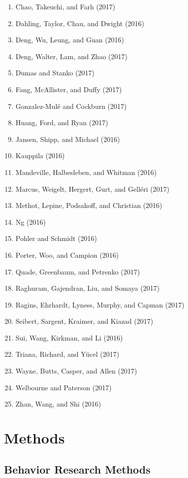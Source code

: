 \documentclass[english,man]{apa6}
\providecommand{\tightlist}{%
  \setlength{\itemsep}{0pt}\setlength{\parskip}{0pt}}
\theoremstyle{definition}
\theoremstyle{definition}
\theoremstyle{definition}
\theoremstyle{remark}
\begin{document}
\begin{enumerate}
\def\labelenumi{\arabic{enumi})}
\tightlist
\item
  Chao, Takeuchi, and Farh (2017)
\item
  Dahling, Taylor, Chau, and Dwight (2016)
\item
  Deng, Wu, Leung, and Guan (2016)
\item
  Deng, Walter, Lam, and Zhao (2017)
\item
  Dumas and Stanko (2017)
\item
  Fang, McAllister, and Duffy (2017)
\item
  Gonzalez-Mulé and Cockburn (2017)
\item
  Huang, Ford, and Ryan (2017)
\item
  Jansen, Shipp, and Michael (2016)
\item
  Kauppila (2016)
\item
  Mandeville, Halbesleben, and Whitman (2016)
\item
  Marcus, Weigelt, Hergert, Gurt, and Gelléri (2017)
\item
  Methot, Lepine, Podsakoff, and Christian (2016)
\item
  Ng (2016)
\item
  Pohler and Schmidt (2016)
\item
  Porter, Woo, and Campion (2016)
\item
  Quade, Greenbaum, and Petrenko (2017)
\item
  Raghuram, Gajendran, Liu, and Somaya (2017)
\item
  Ragins, Ehrhardt, Lyness, Murphy, and Capman (2017)
\item
  Seibert, Sargent, Kraimer, and Kiazad (2017)
\item
  Sui, Wang, Kirkman, and Li (2016)
\item
  Triana, Richard, and Yücel (2017)
\item
  Wayne, Butts, Casper, and Allen (2017)
\item
  Welbourne and Paterson (2017)
\item
  Zhan, Wang, and Shi (2016)
\end{enumerate}

\section{Methods}\label{methods}

\subsection{Behavior Research Methods}\label{behavior-research-methods}
\end{document}
